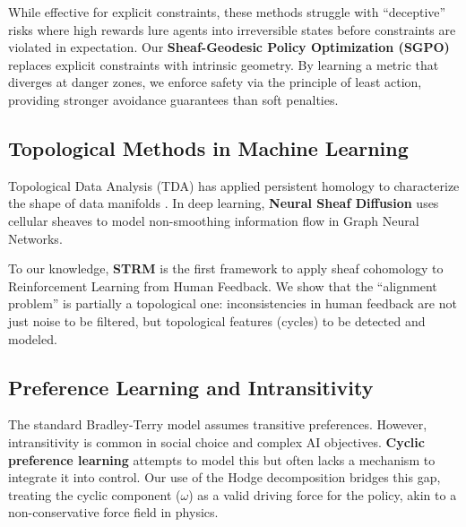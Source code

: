 While effective for explicit constraints, these methods struggle with ``deceptive'' risks where high rewards lure agents into irreversible states before constraints are violated in expectation. Our \textbf{Sheaf-Geodesic Policy Optimization (SGPO)} replaces explicit constraints with intrinsic geometry. By learning a metric that diverges at danger zones, we enforce safety via the principle of least action, providing stronger avoidance guarantees than soft penalties.

\subsection{Topological Methods in Machine Learning}

Topological Data Analysis (TDA) has applied persistent homology to characterize the shape of data manifolds \citep{edelsbrunner2010computational}. In deep learning, \textbf{Neural Sheaf Diffusion} \citep{bodnar2022neural} uses cellular sheaves to model non-smoothing information flow in Graph Neural Networks.

To our knowledge, \textbf{STRM} is the first framework to apply sheaf cohomology to Reinforcement Learning from Human Feedback. We show that the ``alignment problem'' is partially a topological one: inconsistencies in human feedback are not just noise to be filtered, but topological features (cycles) to be detected and modeled.

\subsection{Preference Learning and Intransitivity}

The standard Bradley-Terry model \citep{bradley1952rank} assumes transitive preferences. However, intransitivity is common in social choice \citep{condorcet1785essai} and complex AI objectives. \textbf{Cyclic preference learning} attempts to model this but often lacks a mechanism to integrate it into control. Our use of the Hodge decomposition bridges this gap, treating the cyclic component ($\omega$) as a valid driving force for the policy, akin to a non-conservative force field in physics.
